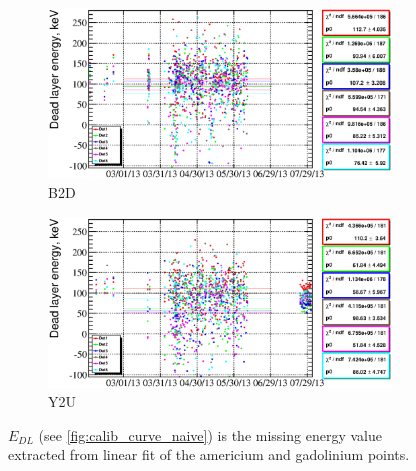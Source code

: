 \documentclass[a4paper,12pt]{article}
\begin{document}
\newcommand\edllabellabel{$E_{DL}$ (see \cref{fig:calib_curve_naive}) is the missing
energy value extracted from linear fit of the americium and gadolinium points.}
\begin{figure}
\begin{subfigure}[b]{0.5\textwidth}
\includegraphics[width=\textwidth]{gfx/run13_alpha_study_novoltagevariation/B2D/c_chDeadLayerEnergy_by_day_B2D.eps}
\caption{B2D}
\end{subfigure}
%
\begin{subfigure}[b]{0.5\textwidth}
\includegraphics[width=\textwidth]{gfx/run13_alpha_study_novoltagevariation/Y2U/c_chDeadLayerEnergy_by_day_Y2U.eps}
\caption{Y2U}
\end{subfigure}
%
\caption{\edllabellabel{}}
\label{fig:e_dl}
\end{figure}
\end{document}
